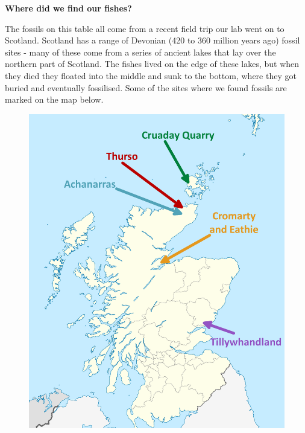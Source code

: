 \documentclass[12pt,letterpaper]{extarticle}
\begin{document}

{\Huge\textbf{Where did we find our fishes?}\par}
\vspace{3mm}

\vspace{5mm}
The fossils on this table all come from a recent field trip our lab went on to Scotland. Scotland has a range of Devonian (420 to 360 million years ago) fossil sites - many of these come from a series of ancient lakes that lay over the northern part of Scotland.  The fishes lived on the edge of these lakes, but when they died they floated into the middle and sunk to the bottom, where they got buried and eventually fossilised. Some of the sites where we found fossils are marked on the map below. \newline

\begin{figure}[h!]
\includegraphics[scale=0.2]{Scotland_sites}
\centering
\end{figure}
\end{document}
